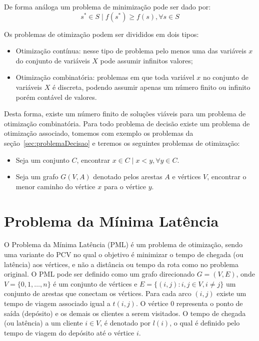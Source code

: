 De forma análoga um problema de minimização pode ser dado por:
\begin{equation}  \label{eq:problemaOtimizacaoMaximizar}
s^* \in S \mid f(s^*) \geq f(s), \forall s \in S
\end{equation}

Os problemas de otimização podem ser divididos em dois tipos:

\begin{itemize}
    \item Otimização contínua: nesse tipo de problema pelo menos uma das variáveis $x$ do conjunto de variáveis $X$ pode assumir infinitos valores;
    \item Otimização combinatória: problemas em que toda variável $x$ no conjunto de variáveis $X$ é discreta, podendo assumir apenas um número finito ou infinito porém contável de valores.
\end{itemize}

Desta forma, existe um número finito de soluções viáveis para um problema de otimização combinatória.
Para todo problema de decisão existe um problema de otimização associado, tomemos com exemplo os problemas da seção~\ref{sec:problemaDecisao} e teremos os seguintes problemas de otimização:

\begin{itemize}
    \item Seja um conjunto $C$, encontrar $x \in C \mid x < y, \forall y \in C$.
    \item Seja um grafo $G(V,A)$ denotado pelos arestas $A$ e vértices $V$, encontrar o menor caminho do vértice $x$ para o vértice $y$.
\end{itemize}

\section{Problema da Mínima Latência}\label{sec:mlp}

O Problema da Mínima Latência (PML) é um problema de otimização, sendo uma variante do PCV no qual o objetivo é minimizar o tempo de chegada (ou latência) aos vértices, e não a distância ou tempo da rota como no problema original.
O PML pode ser definido como um grafo direcionado $G=(V,E)$, onde $V=\{0,1,\dots,n\}$ é um conjunto de vértices e $E = \{(i, j) : i, j \in V, i \ne j \}$ um conjunto de arestas que conectam os vértices.
Para cada arco $(i,j)$ existe um tempo de viagem associado igual a $t(i,j)$. O vértice 0 representa o ponto de saída (depósito) e os demais os clientes a serem visitados.
O tempo de chegada (ou latência) a um cliente $i \in V$, é denotado por $l(i)$, o qual é definido pelo tempo de viagem do depósito até o vértice $i$.

